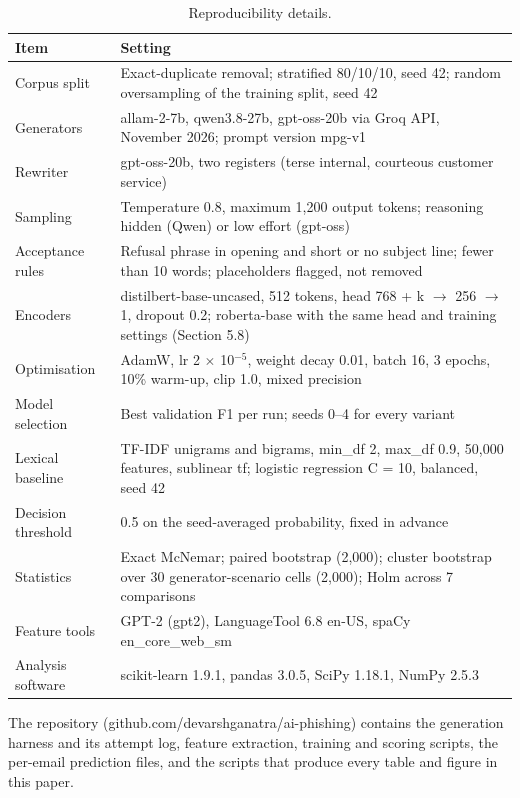 \documentclass[11pt,letterpaper]{article}
\begin{document}
\begin{table}[!htbp]
\centering
\footnotesize
\caption{Reproducibility details.}
\begin{tabularx}{\linewidth}{YY}
\toprule
\textbf{Item} & \textbf{Setting} \\
\midrule
Corpus split & Exact-duplicate removal; stratified 80/10/10, seed 42; random oversampling of the training split, seed 42 \\
Generators & allam-2-7b, qwen3.8-27b, gpt-oss-20b via Groq API, November 2026; prompt version mpg-v1 \\
Rewriter & gpt-oss-20b, two registers (terse internal, courteous customer service) \\
Sampling & Temperature 0.8, maximum 1,200 output tokens; reasoning hidden (Qwen) or low effort (gpt-oss) \\
Acceptance rules & Refusal phrase in opening and short or no subject line; fewer than 10 words; placeholders flagged, not removed \\
Encoders & distilbert-base-uncased, 512 tokens, head 768 + k $\rightarrow$ 256 $\rightarrow$ 1, dropout 0.2; roberta-base with the same head and training settings (Section 5.8) \\
Optimisation & AdamW, lr 2 $\times$ 10$^{-5}$, weight decay 0.01, batch 16, 3 epochs, 10\% warm-up, clip 1.0, mixed precision \\
Model selection & Best validation F1 per run; seeds 0--4 for every variant \\
Lexical baseline & TF-IDF unigrams and bigrams, min\_df 2, max\_df 0.9, 50,000 features, sublinear tf; logistic regression C = 10, balanced, seed 42 \\
Decision threshold & 0.5 on the seed-averaged probability, fixed in advance \\
Statistics & Exact McNemar; paired bootstrap (2,000); cluster bootstrap over 30 generator-scenario cells (2,000); Holm across 7 comparisons \\
Feature tools & GPT-2 (gpt2), LanguageTool 6.8 en-US, spaCy en\_core\_web\_sm \\
Analysis software & scikit-learn 1.9.1, pandas 3.0.5, SciPy 1.18.1, NumPy 2.5.3 \\
\bottomrule
\end{tabularx}
\end{table}

The repository (github.com/devarshganatra/ai-phishing) contains the generation harness and its attempt log, feature extraction, training and scoring scripts, the per-email prediction files, and the scripts that produce every table and figure in this paper.
\end{document}
